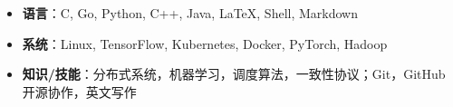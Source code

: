 
  \begin{itemize}[leftmargin=*]
    \item \textbf{语言}：C, Go, Python, C++, Java, \LaTeX, Shell, Markdown
    \item \textbf{系统}：Linux, TensorFlow, Kubernetes, Docker, PyTorch, Hadoop
    \item \textbf{知识/技能}：分布式系统，机器学习，调度算法，一致性协议；Git，GitHub开源协作，英文写作
  \end{itemize}